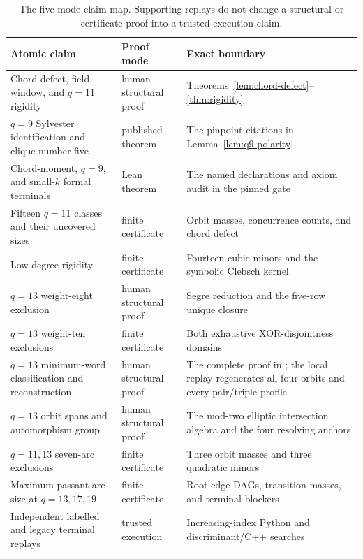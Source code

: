 \documentclass[11pt]{article}
\theoremstyle{remark}
\begin{document}
\begin{table}[H]
\centering
\scriptsize
\begin{tabular}{@{}>{\raggedright\arraybackslash}p{}
                    >{\raggedright\arraybackslash}p{}
                    >{\raggedright\arraybackslash}p{}@{}}
\toprule
Atomic claim & Proof mode & Exact boundary \\
\midrule
Chord defect, field window, and $q=11$ rigidity
& human structural proof & Theorems~\ref{lem:chord-defect}--\ref{thm:rigidity} \\
$q=9$ Sylvester identification and clique number five
& published theorem & The pinpoint citations in Lemma~\ref{lem:q9-polarity} \\
Chord-moment, $q=9$, and small-$k$ formal terminals
& Lean theorem & The named declarations and axiom audit in the pinned gate \\
Fifteen $q=11$ classes and their uncovered sizes
& finite certificate & Orbit masses, concurrence counts, and chord defect \\
Low-degree rigidity
& finite certificate & Fourteen cubic minors and the symbolic Clebsch kernel \\
$q=13$ weight-eight exclusion
& human structural proof & Segre reduction and the five-row unique closure \\
$q=13$ weight-ten exclusions
& finite certificate & Both exhaustive XOR-disjointness domains \\
$q=13$ minimum-word classification and reconstruction
& human structural proof & The complete proof in \cite{RuddPassant2026}; the local replay
  regenerates all four orbits and every pair/triple profile \\
$q=13$ orbit spans and automorphism group
& human structural proof & The mod-two elliptic intersection algebra and
  the four resolving anchors \\
$q=11,13$ seven-arc exclusions
& finite certificate & Three orbit masses and three quadratic minors \\
Maximum passant-arc size at $q=13,17,19$
& finite certificate & Root-edge DAGs, transition masses, and terminal blockers \\
Independent labelled and legacy terminal replays
& trusted execution & Increasing-index Python and discriminant/C++ searches \\
\bottomrule
\end{tabular}
\caption{The five-mode claim map.  Supporting replays do not change a
structural or certificate proof into a trusted-execution claim.}
\label{tab:claim-modes}
\end{table}
\end{document}
